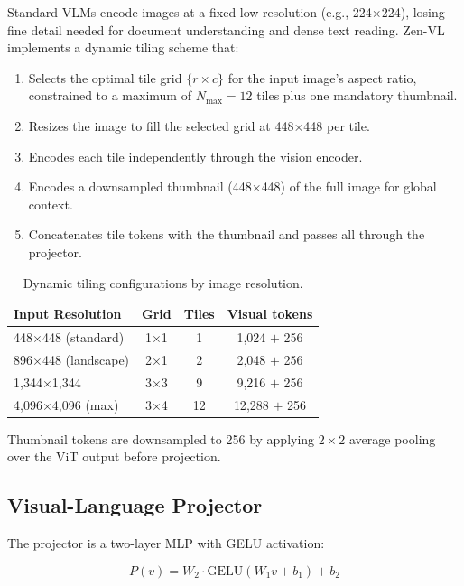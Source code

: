 \documentclass[11pt,a4paper]{article}
\begin{document}
Standard VLMs encode images at a fixed low resolution (e.g., 224$\times$224), losing fine
detail needed for document understanding and dense text reading. Zen-VL implements a dynamic
tiling scheme that:

\begin{enumerate}
  \item Selects the optimal tile grid $\{r \times c\}$ for the input image's aspect ratio,
        constrained to a maximum of $N_{\max}=12$ tiles plus one mandatory thumbnail.
  \item Resizes the image to fill the selected grid at 448$\times$448 per tile.
  \item Encodes each tile independently through the vision encoder.
  \item Encodes a downsampled thumbnail (448$\times$448) of the full image for global context.
  \item Concatenates tile tokens with the thumbnail and passes all through the projector.
\end{enumerate}

\begin{table}[H]
\centering
\caption{Dynamic tiling configurations by image resolution.}
\label{tab:tiling}
\begin{tabular}{lccc}
\toprule
\textbf{Input Resolution} & \textbf{Grid} & \textbf{Tiles} & \textbf{Visual tokens} \\
\midrule
448$\times$448 (standard)     & 1$\times$1 & 1    & 1{,}024 $+$ 256 \\
896$\times$448 (landscape)    & 2$\times$1 & 2    & 2{,}048 $+$ 256 \\
1{,}344$\times$1{,}344        & 3$\times$3 & 9    & 9{,}216 $+$ 256 \\
4{,}096$\times$4{,}096 (max)  & 3$\times$4 & 12   & 12{,}288 $+$ 256 \\
\bottomrule
\end{tabular}
\end{table}

Thumbnail tokens are downsampled to 256 by applying $2\times2$ average pooling over the
ViT output before projection.

\subsection{Visual-Language Projector}

The projector is a two-layer MLP with GELU activation:

\begin{equation}
  P(v) = W_2 \cdot \text{GELU}(W_1 v + b_1) + b_2
\end{equation}
\end{document}
